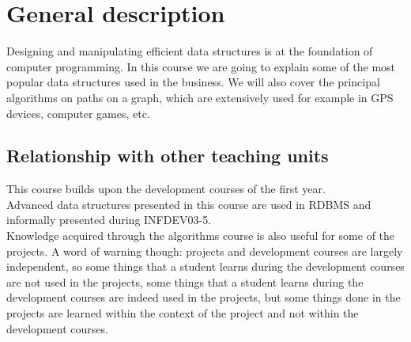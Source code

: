 \section{General description}
	Designing and manipulating efficient data structures is at the foundation of computer programming. In this course we are going to explain some of the most popular data structures used in the business. We will also cover the principal algorithms on paths on a graph, which are extensively used for example in GPS devices, computer games, etc.  \\

	\subsection{Relationship with other teaching units}
		This course builds upon the development courses of the first year.	\\		

		Advanced data structures presented in this course are used in RDBMS and informally presented during INFDEV03-5. \\
		
		Knowledge acquired through the algorithms course is also useful for some of the projects. A word of warning though: projects and development courses are largely independent, so some things that a student learns during the development courses are not used in the projects, some things that a student learns during the development courses are indeed used in the projects, but some things done in the projects are learned within the context of the project and not within the development courses.
